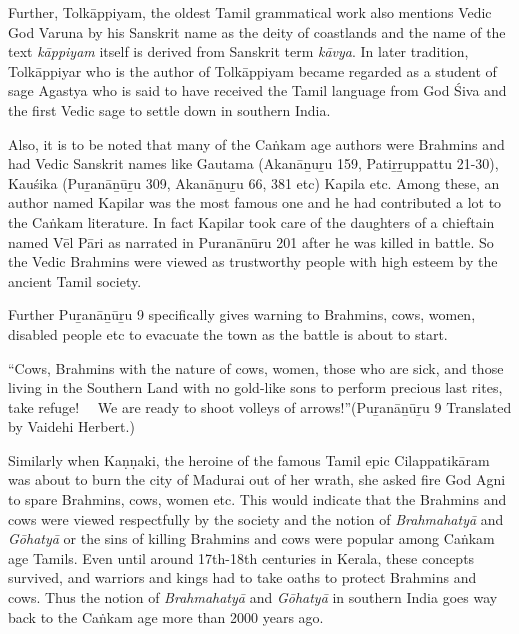 Further, Tolkāppiyam, the oldest Tamil grammatical work also mentions Vedic God Varuna by his Sanskrit name as the deity of coastlands and the name of the text \textit{kāppiyam} itself is derived from Sanskrit term \textit{kāvya}. In later tradition, Tolkāppiyar who is the author of Tolkāppiyam became regarded as a student of sage Agastya who is said to have received the Tamil language from God Śiva and the first Vedic sage to settle down in southern India.

Also, it is to be noted that many of the Caṅkam age authors were Brahmins and had Vedic Sanskrit names like Gautama (Akanāṉuṟu 159, Patiṟṟuppattu 21-30), Kauśika (Puṟanāṉūṟu 309, Akanāṉuṟu 66, 381 etc) Kapila etc. Among these, an author named Kapilar was the most famous one and he had contributed a lot to the Caṅkam literature. In fact Kapilar took care of the daughters of a chieftain named Vēl Pāri as narrated in Puranānūru 201 after he was killed in battle. So the Vedic Brahmins were viewed as trustworthy people with high esteem by the ancient Tamil society.

Further Puṟanāṉūṟu 9 specifically gives warning to Brahmins, cows, women, disabled people etc to evacuate the town as the battle is about to start.

\begin{myquote}
“Cows, Brahmins with the nature of cows, women, those who are sick, and those living in the Southern Land with no gold-like sons to perform precious last rites, take refuge!   We are ready to shoot volleys of arrows!”\hfill (Puṟanāṉūṟu 9 Translated by Vaidehi Herbert.)
\end{myquote}

Similarly when Kaṇṇaki, the heroine of the famous Tamil epic Cilappatikāram was about to burn the city of Madurai out of her wrath, she asked fire God Agni to spare Brahmins, cows, women etc. This would indicate that the Brahmins and cows were viewed respectfully by the society and the notion of \textit{Brahmahatyā} and \textit{Gōhatyā} or the sins of killing Brahmins and cows were popular among Caṅkam age Tamils. Even until around 17th-18th centuries in Kerala, these concepts survived, and warriors and kings had to take oaths to protect Brahmins and cows. Thus the notion of \textit{Brahmahatyā} and \textit{Gōhatyā} in southern India goes way back to the Caṅkam age more than 2000 years ago.

